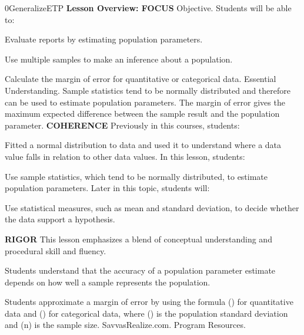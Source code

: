 \documentclass{article}
\newenvironment{te-addendum}[2]{}{}     %
\newcommand{\te}[1]{}                   %
\begin{document}
\begin{te-addendum}{0}{GeneralizeETP}
\textbf{Lesson Overview: FOCUS}
Objective. Students will be able to:
\item Evaluate reports by estimating population parameters.
\item Use multiple samples to make an inference about a population.
\item Calculate the margin of error for quantitative or categorical data.
Essential Understanding. Sample statistics tend to be normally distributed and therefore can be used to estimate population parameters. The margin of error gives the maximum expected difference between the sample result and the population parameter.
\textbf{COHERENCE}
Previously in this courses, students:
\item Fitted a normal distribution to data and used it to understand where a data value falls in relation to other data values.
In this lesson, students:
\item Use sample statistics, which tend to be normally distributed, to estimate population parameters.
Later in this topic, students will:
\item Use statistical measures, such as mean and standard deviation, to decide whether the data support a hypothesis.
\te{Printed this courses; likely this course.}
\textbf{RIGOR}
This lesson emphasizes a blend of conceptual understanding and procedural skill and fluency.
\item Students understand that the accuracy of a population parameter estimate depends on how well a sample represents the population.
\item Students approximate a margin of error by using the formula () for quantitative data and () for categorical data, where (\sigma) is the population standard deviation and (n) is the sample size.
SavvasRealize.com. Program Resources.
\end{te-addendum}
\end{document}
